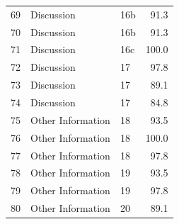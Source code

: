 \begin{longtable}{rllr}
69 & Discussion & 16b & 91.3 \\
70 & Discussion & 16b & 91.3 \\
71 & Discussion & 16c & 100.0 \\
72 & Discussion & 17 & 97.8 \\
73 & Discussion & 17 & 89.1 \\
74 & Discussion & 17 & 84.8 \\
75 & Other Information & 18 & 93.5 \\
76 & Other Information & 18 & 100.0 \\
77 & Other Information & 18 & 97.8 \\
78 & Other Information & 19 & 93.5 \\
79 & Other Information & 19 & 97.8 \\
80 & Other Information & 20 & 89.1 \\

\end{longtable}

